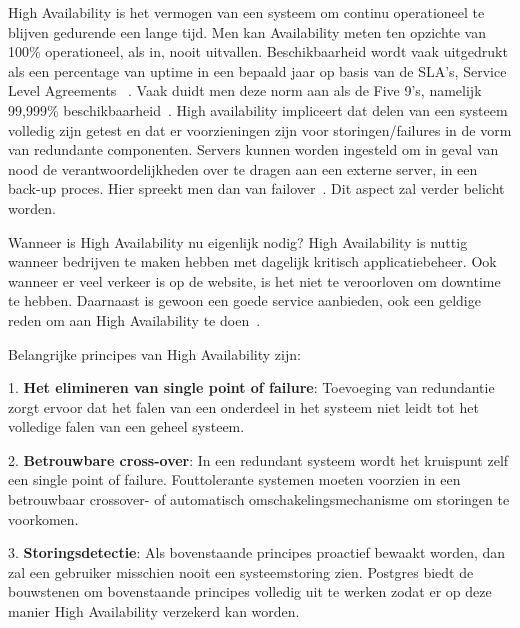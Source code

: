 

High Availability is het vermogen van een systeem om continu operationeel te blijven gedurende een lange tijd. Men kan Availability meten ten opzichte van 100\% operationeel, als in, nooit uitvallen. Beschikbaarheid wordt vaak uitgedrukt als een percentage van uptime in een bepaald jaar op basis van de SLA's, Service Level Agreements ~\autocite{Kumar2020}. Vaak duidt men deze norm aan als de Five 9's, namelijk 99,999\% beschikbaarheid~\autocite{Lutkevich2021}. High availability impliceert dat delen van een systeem volledig zijn getest en dat er voorzieningen zijn voor storingen/failures in de vorm van redundante componenten. Servers kunnen worden ingesteld om in geval van nood de verantwoordelijkheden over te dragen aan een externe server, in een back-up proces. Hier spreekt men dan van failover~\autocite{Technopedia2021a}. Dit aspect zal verder belicht worden.

Wanneer is High Availability nu eigenlijk nodig?
High Availability is nuttig wanneer bedrijven te maken hebben met dagelijk kritisch applicatiebeheer. Ook wanneer er veel verkeer is op de website, is het niet te veroorloven om downtime te hebben. Daarnaast is gewoon een goede service aanbieden, ook een geldige reden om aan High Availability te doen~\autocite{CriticalCase2020}. 


Belangrijke principes van High Availability zijn:

1. \textbf{Het elimineren van single point of failure}: Toevoeging van redundantie zorgt ervoor dat het falen van een onderdeel in het systeem niet leidt tot het volledige falen van een geheel systeem.

2. \textbf{Betrouwbare cross-over}: In een redundant systeem wordt het kruispunt zelf een single point of failure. Fouttolerante systemen moeten voorzien in een betrouwbaar crossover- of automatisch omschakelingsmechanisme om storingen te voorkomen.

3. \textbf{Storingsdetectie}: Als bovenstaande principes proactief bewaakt worden, dan zal een gebruiker misschien nooit een systeemstoring zien.
Postgres biedt de bouwstenen om bovenstaande principes volledig uit te werken zodat er op deze manier High Availability verzekerd kan worden.

